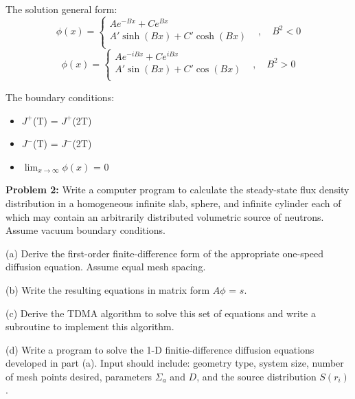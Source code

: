 \documentclass{amsart}
\theoremstyle{definition}
\begin{document}
The solution general form:
\bigbreak
\[   \phi(x) = \left\{
\begin{array}{ll}
      Ae^{-Bx} + Ce^{Bx} &  \\
      A'\sinh(Bx) + C'\cosh(Bx) &  \\
\end{array}
\right. , \quad B^2 < 0\]
\bigbreak
\[   \phi(x) = \left\{
\begin{array}{ll}
      Ae^{-iBx} + Ce^{iBx} &  \\
      A'\sin(Bx) + C'\cos(Bx) &  \\
\end{array}
\right. , \quad B^2 > 0\]
\bigbreak


The boundary conditions:
\begin{itemize}
    \item $J^+$(T) = $J^+$(2T)
    \item $J^-$(T) = $J^-$(2T)
    \item $\lim_{x \to \infty} \phi(x)$ = 0
\end{itemize}
\bigbreak





\newpage

\textbf{Problem 2:} Write a computer program to calculate the steady-state flux density distribution in a homogeneous infinite slab, sphere, and infinite cylinder each of which may contain an arbitrarily distributed volumetric source of neutrons.
Assume vacuum boundary conditions.
\bigbreak

(a) Derive the first-order finite-difference form of the appropriate one-speed diffusion equation.
Assume equal mesh spacing.\newline
\bigbreak

(b) Write the resulting equations in matrix form \textbf{$A\phi$} = \textbf{$s$}.\newline
\bigbreak

(c) Derive the TDMA algorithm to solve this set of equations and write a subroutine to implement this algorithm.\newline
\bigbreak

(d) Write a program to solve the 1-D finitie-difference diffusion equations developed in part (a).
Input should include: geometry type, system size, number of mesh points desired, parameters $\Sigma_a$ and $D$, and the source distribution $S(r_i)$.\newline
\bigbreak
\end{document}
